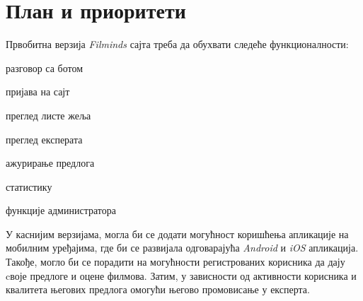 \section{План и приоритети}

Првобитна верзија \textit{Filminds} сајта треба да обухвати следеће функционалности:

\begin{description}[font=$\bullet$~\normalfont\scshape]
    \item разговор са ботом
    \item пријава на сајт
    \item преглед листе жеља
    \item преглед експерата
    \item ажурирање предлога
    \item статистику
    \item функције администратора
\end{description}

У каснијим верзијама, могла би се додати могућност коришћења апликације на мобилним уређајима,
где би се развијала одговарајућа \textit{Android} и \textit{iOS} апликација. Такође, могло би
се порадити на могућности регистрованих корисника да дају cвоје предлоге и оцене филмова. Затим,
у зависности од активности корисника и квалитета његових предлога омогући његово промовисање у
експерта.
